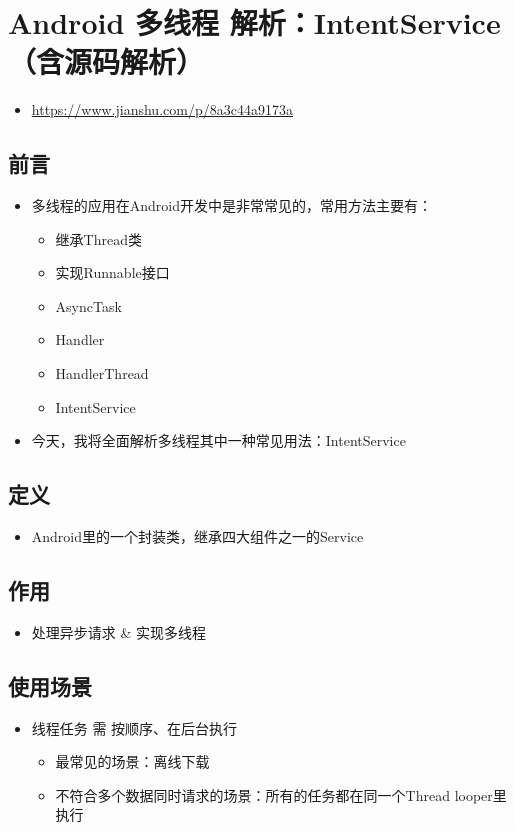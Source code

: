 \documentclass[9pt, b5paper]{article}
\begin{document}
\section{Android 多线程 解析：IntentService（含源码解析）}
\label{sec-4}
\begin{itemize}
\item \url{https://www.jianshu.com/p/8a3c44a9173a}
\end{itemize}
\subsection{前言}
\label{sec-4-1}
\begin{itemize}
\item 多线程的应用在Android开发中是非常常见的，常用方法主要有：
\begin{itemize}
\item 继承Thread类
\item 实现Runnable接口
\item AsyncTask
\item Handler
\item HandlerThread
\item IntentService
\end{itemize}
\item 今天，我将全面解析多线程其中一种常见用法：IntentService
\end{itemize}
\subsection{定义}
\label{sec-4-2}
\begin{itemize}
\item Android里的一个封装类，继承四大组件之一的Service
\end{itemize}
\subsection{作用}
\label{sec-4-3}
\begin{itemize}
\item 处理异步请求 \& 实现多线程
\end{itemize}
\subsection{使用场景}
\label{sec-4-4}
\begin{itemize}
\item 线程任务 需 按顺序、在后台执行
\begin{itemize}
\item 最常见的场景：离线下载
\item 不符合多个数据同时请求的场景：所有的任务都在同一个Thread looper里执行
\end{itemize}
\end{itemize}
\end{document}
